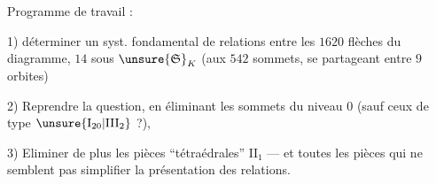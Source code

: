 Programme de travail :

1) déterminer un syst. fondamental de relations entre les \(1620\) flèches du diagramme,   \(14\)  sous \(\unsure{\mathfrak S}_K\) (aux \(542\) sommets, se partageant entre \(9\) orbites)



2) Reprendre la question, en éliminant les sommets du niveau \(0\) (sauf  ceux de type \(\unsure{\mathrm I_{20}|\mathrm{III}_2}\) ?),

3) Eliminer de plus les pièces  ``tétraédrales'' \(\mathrm{II}_1\) --- et toutes les pièces qui ne semblent pas simplifier la présentation des relations.


